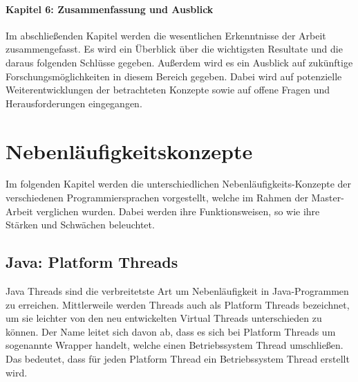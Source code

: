 \documentclass[fontsize=12pt,paper=a4,twoside=semi,parskip=half-,headsepline,headinclude]{scrreprt}
\begin{document}
\subsubsection{Kapitel 6: Zusammenfassung und Ausblick}

Im abschließenden Kapitel werden die wesentlichen Erkenntnisse der Arbeit zusammengefasst. Es wird ein Überblick über die wichtigsten Resultate und die daraus folgenden Schlüsse gegeben. Außerdem wird es ein Ausblick auf zukünftige Forschungsmöglichkeiten in diesem Bereich gegeben. Dabei wird auf potenzielle Weiterentwicklungen der betrachteten Konzepte sowie auf offene Fragen und Herausforderungen eingegangen.

\chapter{Nebenläufigkeitskonzepte}

Im folgenden Kapitel werden die unterschiedlichen Nebenläufigkeits-Konzepte der verschiedenen Programmiersprachen vorgestellt, welche im Rahmen der Master-Arbeit verglichen wurden. Dabei werden ihre Funktionsweisen, so wie ihre Stärken und Schwächen beleuchtet.

\section{Java: Platform Threads}

Java Threads sind die verbreitetste Art um Nebenläufigkeit in Java-Programmen zu erreichen. Mittlerweile werden Threads auch als Platform Threads bezeichnet, um sie leichter von den neu entwickelten Virtual Threads unterschieden zu können. Der Name leitet sich davon ab, dass es sich bei Platform Threads um sogenannte Wrapper handelt, welche einen Betriebssystem Thread umschließen. Das bedeutet, dass für jeden Platform Thread ein Betriebssystem Thread erstellt wird.
\end{document}
